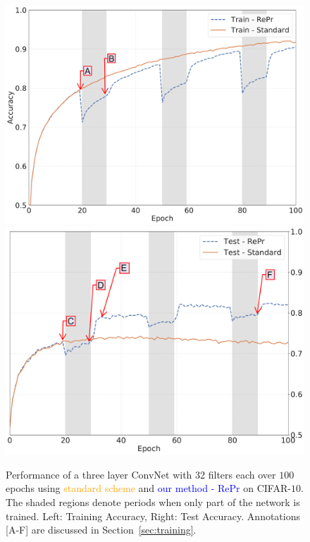 \begin{figure}[H]
\center
   \includegraphics[width=0.47\linewidth]{figures/repr/RePr_Train.pdf}
   \includegraphics[width=0.45\linewidth]{figures/repr/RePr_Test.pdf}
   \caption[Performance Standard vs RePr]{Performance of a three layer ConvNet with 32 filters each over $100$ epochs using \textcolor{orange}{standard scheme} and \textcolor{blue}{our method - RePr} on CIFAR-$10$. The shaded regions denote periods when only part of the network is trained. 
   Left: Training Accuracy, Right: Test Accuracy. Annotations [A-F] are discussed in Section~\ref{sec:training}.}
   \label{fig:REPR}
\end{figure}


